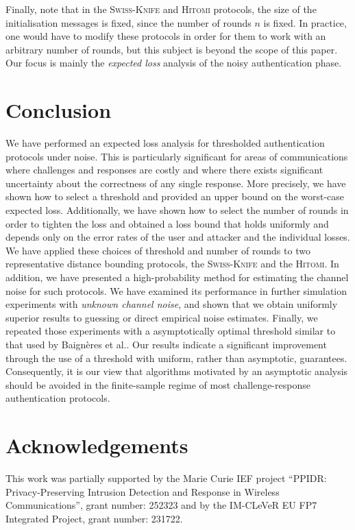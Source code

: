 \documentclass[a4paper]{article}
\newcommand \Swiss {\textsc{Swiss-Knife}}
\newcommand \Hitomi {\textsc{Hitomi}}
\theoremstyle{plain} \newtheorem{remark}{Remark}
\theoremstyle{plain} \newtheorem{definition}{Definition}
\theoremstyle{plain} \newtheorem{example}{Example}
\theoremstyle{plain} \newtheorem{assumption}{Assumption}
\theoremstyle{plain} \newtheorem{conjecture}{Conjecture}
\theoremstyle{plain} \newtheorem{theorem}{Theorem}
\theoremstyle{plain} \newtheorem{proposition}{Proposition}
\theoremstyle{plain} \newtheorem{lemma}{Lemma}
\theoremstyle{plain} \newtheorem{corollary}{Corollary}
\begin{document}
Finally, note that in the {\Swiss} and {\Hitomi} protocols, the size
of the initialisation messages is fixed, since the number of rounds
$n$ is fixed.  In practice, one would have to modify these protocols
in order for them to work with an arbitrary number of rounds, but this
subject is beyond the scope of this paper. Our focus is mainly the
{\em expected loss} analysis of the noisy authentication phase.


\section{Conclusion}
\label{sec:conclusion} 

We have performed an expected loss analysis for thresholded
authentication protocols under noise.  This is particularly
significant for areas of communications where challenges and responses
are costly and where there exists significant uncertainty about the
correctness of any single response. More precisely, we have shown how
to select a threshold and provided an upper bound on the worst-case
expected loss. Additionally, we have shown how to select the number of
rounds in order to tighten the loss and obtained a loss bound that
holds uniformly and depends only on the error rates of the user and
attacker and the individual losses.  We have applied these choices of
threshold and number of rounds to two representative distance bounding
protocols, the {\Swiss} and the \Hitomi. In addition, we have
presented a high-probability method for estimating the channel noise
for such protocols.  We have examined its performance in further
simulation experiments with {\em unknown channel noise}, and shown
that we obtain uniformly superior results to guessing or direct
empirical noise estimates. Finally, we repeated those experiments with
a asymptotically optimal threshold similar to that used by
Baign\`{e}res et al.\cite{ProvSec2010}. Our results indicate a
significant improvement through the use of a threshold with uniform,
rather than asymptotic, guarantees. Consequently, it is our view that
algorithms motivated by an asymptotic analysis should be avoided in
the finite-sample regime of most challenge-response authentication
protocols.







\section*{Acknowledgements}
This work was partially supported by the Marie Curie IEF project
``PPIDR: Privacy-Preserving Intrusion Detection and Response in
Wireless Communications'', grant number: 252323 and by the IM-CLeVeR
EU FP7 Integrated Project, grant number: 231722.
\end{document}
